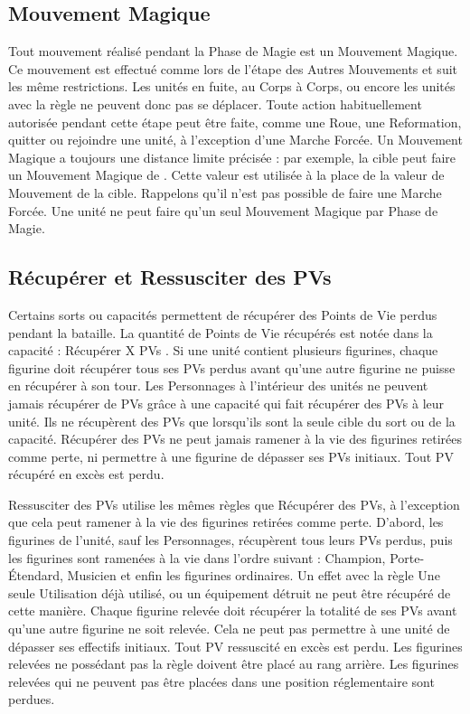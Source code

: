 \hypertarget{magicalmove}{\subsection{Mouvement Magique}}
\label{magicalmove}

Tout mouvement réalisé pendant la Phase de Magie est un Mouvement Magique. Ce mouvement est effectué comme lors de l'étape des Autres Mouvements et suit les même restrictions. Les unités en fuite, au Corps à Corps, ou encore les unités avec la règle \randommovement{} ne peuvent donc pas se déplacer. Toute action habituellement autorisée pendant cette étape peut être faite, comme une Roue, une Reformation, quitter ou rejoindre une unité, à l'exception d'une Marche Forcée. Un Mouvement Magique a toujours une distance limite précisée : par exemple, \og la cible peut faire un Mouvement Magique de  \fg{}. Cette valeur est utilisée à la place de la valeur de Mouvement de la cible. Rappelons qu'il n'est pas possible de faire une Marche Forcée. Une unité ne peut faire qu'un seul Mouvement Magique par Phase de Magie.

\hypertarget{recoverandraisewounds}{\subsection{Récupérer et Ressusciter des PVs}}
\label{recoverandraisewounds}

Certains sorts ou capacités permettent de récupérer des Points de Vie perdus pendant la bataille. La quantité de Points de Vie récupérés est notée dans la capacité  : \og Récupérer X PVs \fg{}. Si une unité contient plusieurs figurines, chaque figurine doit récupérer tous ses PVs perdus avant qu'une autre figurine ne puisse en récupérer à son tour. Les Personnages à l'intérieur des unités ne peuvent jamais récupérer de PVs grâce à une capacité qui fait récupérer des PVs à leur unité. Ils ne récupèrent des PVs que lorsqu'ils sont la seule cible du sort ou de la capacité. Récupérer des PVs ne peut jamais ramener à la vie des figurines retirées comme perte, ni permettre à une figurine de dépasser ses PVs initiaux. Tout PV récupéré en excès est perdu.

Ressusciter des PVs utilise les mêmes règles que Récupérer des PVs, à l'exception que cela peut ramener à la vie des figurines retirées comme perte. D'abord, les figurines de l'unité, sauf les Personnages, récupèrent tous leurs PVs perdus, puis les figurines sont ramenées à la vie dans l'ordre suivant : Champion, Porte-Étendard, Musicien et enfin les figurines ordinaires. Un effet avec la règle Une seule Utilisation déjà utilisé, ou un équipement détruit ne peut être récupéré de cette manière. Chaque figurine relevée doit récupérer la totalité de ses PVs avant qu'une autre figurine ne soit relevée. Cela ne peut pas permettre à une unité de dépasser ses effectifs initiaux. Tout PV ressuscité en excès est perdu. Les figurines relevées ne possédant pas la règle \frontrank{} doivent être placé au rang arrière. Les figurines relevées qui ne peuvent pas être placées dans une position réglementaire sont perdues.

